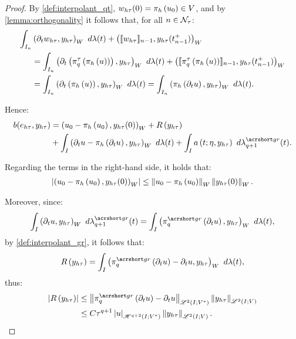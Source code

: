 \begin{proof}
    By \cref{def:interpolant_qt}, $w_{h \tau}(0) = \pi_h \left( u_0 \right) \in V$, and by \cref{lemma:orthogonality} it follows that, for all $n \in \mathcal{N}_{\tau}$:
    \begin{align*}
        \int_{I_n} &\left( \partial_t w_{h \tau}, y_{h \tau}\right)_W ~ d \lambda(t) + \left( \llbracket w_{h \tau} \rrbracket_{n - 1}, y_{h \tau}(t_{n - 1}^+) \right)_W \\
        &= \int_{I_n} \left( \partial_t \left( \pi^{\tau}_q \left( \pi_h \left( u \right) \right) \right), y_{h \tau}\right)_W ~ d \lambda(t) + \left( \llbracket \pi^{\tau}_q \left( \pi_h \left( u \right) \right) \rrbracket_{n - 1}, y_{h \tau}(t_{n - 1}^+) \right)_W \\
        &= \int_{I_n} \left( \partial_t \left( \pi_h \left( u \right) \right), y_{h \tau}\right)_W ~ d \lambda(t) = \int_{I_n} \left( \pi_h \left( \partial_t u \right), y_{h \tau}\right)_W ~ d \lambda(t).
    \end{align*}

    Hence:
    \begin{align*}
        b(e_{h \tau}, y_{h \tau}) &= \left( u_0 - \InterpolantH \left( u_0 \right), y_{h \tau}(0) \right)_W + \Remainder \left( y_{h \tau} \right) \\
        &+ \int_I \left( \partial_t u - \InterpolantH \left( \partial_t u \right), y_{h \tau}\right)_W ~ d \lambda(t) + \int_I a \left( t; \eta, y_{h \tau}\right) ~ d \lambdaGR_{q + 1}(t).
    \end{align*}

    Regarding the terms in the right-hand side, it holds that:
    \begin{align*}
        \left\lvert \left( u_0 - \pi_h \left( u_0 \right), y_{h \tau}(0) \right)_W \right\rvert \leq \left\lVert  u_0 - \pi_h \left( u_0 \right)  \right\rVert_W \left\lVert  y_{h \tau}(0)  \right\rVert_W.
    \end{align*}

    Moreover, since:
    \begin{align*}
        \int_I \left( \partial_t u, y_{h \tau}\right)_W ~ d \lambdaGR_{q + 1}(t) = \int_I \left( \InterpolantGR_q \left( \partial_t u \right), y_{h \tau}\right)_W ~ d \lambda(t),
    \end{align*}
    by \cref{def:interpolant_gr}, it follows that:
    \begin{align*}
        \Remainder \left( y_{h \tau} \right) = \int_I \left( \InterpolantGR_q \left( \partial_t u \right) - \partial_t u, y_{h \tau}\right)_W ~ d \lambda(t),
    \end{align*}
    thus:
    \begin{align*}
        \left\lvert \Remainder \left( y_{h \tau} \right) \right\rvert &\leq \Norm{ \InterpolantGR_q \left( \partial_t u \right) - \partial_t u }_{\SpaceLp{2}(I; V^*)} \Norm{ y_{h \tau} }_{\SpaceLp{2}(I; V)} \\
        &\leq C \tau^{q + 1} \Seminorm{u}_{\SpaceHk{q + 2}(I; V^*)} \Norm{ y_{h \tau} }_{\SpaceLp{2}(I; V)}.
    \end{align*}


\end{proof}
